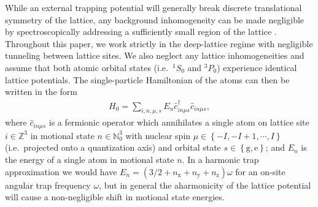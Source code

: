 \documentclass[preprint,showkeys,nofootinbib]{revtex4-1}
\newcommand{\p}[1]{\left(#1\right)} %
\renewcommand{\set}[1]{\left\{#1\right\}} %
\newcommand{\g}{\text{g}}
\newcommand{\e}{\text{e}}
\newcommand{\x}{\text{x}}
\newcommand{\y}{\text{y}}
\newcommand{\z}{\text{z}}
\renewcommand{\c}{\hat{c}}
\newcommand{\1}{\mathds{1}}
\begin{document}
While an external trapping potential will generally break discrete
translational symmetry of the lattice, any background inhomogeneity
can be made negligible by spectroscopically addressing a sufficiently
small region of the lattice \cite{goban2018emergence}.  Throughout
this paper, we work strictly in the deep-lattice regime with
negligible tunneling between lattice sites.  We also neglect any
lattice inhomogeneities and assume that both atomic orbital states
(i.e.~${}^1S_0$ and ${}^3P_0$) experience identical lattice
potentials.  The single-particle Hamiltonian of the atoms can then be
written in the form
\begin{align}
  H_0 = \sum_{i,n,\mu,s} E_n \c_{in\mu s}^\dag \c_{in\mu s},
  \label{eq:H_0}
\end{align}
where $\c_{in\mu s}$ is a fermionic operator which annihilates a
single atom on lattice site $i\in\mathbb{Z}^3$ in motional state
$n\in\mathbb{N}_0^3$ with nuclear spin $\mu\in\set{-I,-I+1,\cdots,I}$
(i.e.~projected onto a quantization axis) and orbital state
$s\in\set{\g,\e}$; and $E_n$ is the energy of a single atom in
motional state $n$.  In a harmonic trap approximation we would have
$E_n=\p{3/2+n_\x+n_\y+n_\z}\omega$ for an on-site angular trap
frequency $\omega$, but in general the aharmonicity of the lattice
potential will cause a non-negligible shift in motional state
energies.
\end{document}
